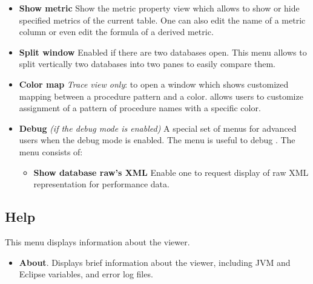 \documentclass[english]{article}
\begin{document}
\begin{itemize}
 \item \textbf{Show metric}
Show the metric property view which allows to show or hide specified metrics of the current table.
One can also edit the name of a metric column or even edit the formula of a derived metric.

 \item \textbf{Split window}
 Enabled if there are two databases open. This menu allows to split vertically two databases into two panes to easily compare them.

 \item \textbf{Color map} \emph{Trace view only}: to open a window which shows customized mapping between a procedure pattern and a color.  allows users to customize assignment of a pattern of procedure names with a specific color.

 \item \textbf{Debug} \emph{(if the debug mode is enabled)}
 A special set of menus for advanced users when the debug mode is enabled. The menu is useful to debug . The menu consists of:

   \begin{itemize}
     \item \textbf{Show database raw's XML}
 	Enable one to request display of raw XML representation for performance data.
  \end{itemize}

\end{itemize}


\subsection{Help}

This menu displays information about the viewer.
\begin{itemize}

\item \textbf{About}.
  Displays brief information about the viewer, including JVM and Eclipse variables, and error log files.

\end{itemize}



\end{document}
